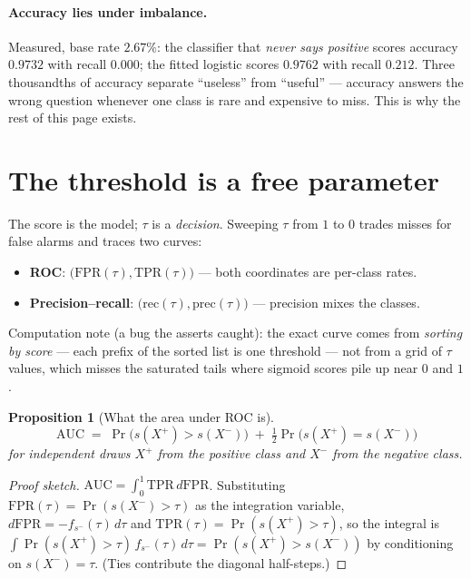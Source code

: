 \documentclass[11pt]{article}
\newtheorem{proposition}{Proposition}
\begin{document}
\paragraph{Accuracy lies under imbalance.} Measured, base rate
$2.67\%$: the classifier that \emph{never says positive} scores
accuracy $0.9732$ with recall $0.000$; the fitted logistic scores
$0.9762$ with recall $0.212$. Three thousandths of accuracy separate
``useless'' from ``useful'' --- accuracy answers the wrong question
whenever one class is rare and expensive to miss. This is why the rest
of this page exists.

\section{The threshold is a free parameter}

The score is the model; $\tau$ is a \emph{decision}. Sweeping $\tau$
from $1$ to $0$ trades misses for false alarms and traces two curves:
\begin{itemize}
  \item \textbf{ROC}: $\bigl(\mathrm{FPR}(\tau),
    \mathrm{TPR}(\tau)\bigr)$ --- both coordinates are per-class rates.
  \item \textbf{Precision--recall}:
    $\bigl(\mathrm{rec}(\tau), \mathrm{prec}(\tau)\bigr)$ --- precision
    mixes the classes.
\end{itemize}
Computation note (a bug the asserts caught): the exact curve comes from
\emph{sorting by score} --- each prefix of the sorted list is one
threshold --- not from a grid of $\tau$ values, which misses the
saturated tails where sigmoid scores pile up near $0$ and $1$.

\begin{proposition}[What the area under ROC is]
\begin{equation}
  \boxed{\;\mathrm{AUC} \;=\; \Pr\bigl(s(X^+) > s(X^-)\bigr)
  \;+\; \tfrac12 \Pr\bigl(s(X^+) = s(X^-)\bigr)\;}
  \label{eq:auc}
\end{equation}
for independent draws $X^+$ from the positive class and $X^-$ from the
negative class.
\end{proposition}

\begin{proof}[Proof sketch]
$\mathrm{AUC} = \int_0^1 \mathrm{TPR}\, d\mathrm{FPR}$. Substituting
$\mathrm{FPR}(\tau) = \Pr(s(X^-) > \tau)$ as the integration variable,
$d\mathrm{FPR} = -f_{s^-}(\tau)\,d\tau$ and $\mathrm{TPR}(\tau) =
\Pr(s(X^+) > \tau)$, so the integral is
$\int \Pr(s(X^+) > \tau)\, f_{s^-}(\tau)\, d\tau
= \Pr(s(X^+) > s(X^-))$ by conditioning on $s(X^-) = \tau$. (Ties
contribute the diagonal half-steps.)
\end{proof}
\end{document}
